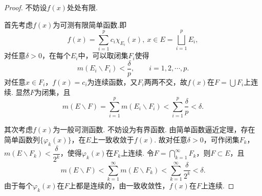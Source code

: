 \documentclass[12pt]{ctexart}
\theoremstyle{definition}
\theoremstyle{plain}
\begin{document}
	\begin{proof}
		不妨设$f(x)$处处有限.
		
		首先考虑$f(x)$为可测有限简单函数.即
		$$f(x)=\sum_{i=1}^{p}c_i\chi_{E_i}(x),\ x\in E=\bigsqcup_{i=1}^{p}E_i,$$
		对任意$\delta>0$，在每个$E_i$中，可以取闭集$F_i$使得
		$$m(E_i\backslash F_i)<\frac{\delta}{p},\qquad i=1,2,\cdots,p.$$ 
		对任意$x\in F_i$，$f(x)=c_i$为连续函数，又$F_i$两两不交，故$f(x)$在$F=\bigcup F_i$上连续. 显然$F$为闭集，且
		$$m(E\backslash F)=\sum_{i=1}^{p}m(E_i\backslash F_i)<\sum_{i=1}^{p}\frac{\delta}{p}<\delta.$$
		
		其次考虑$f(x)$为一般可测函数. 不妨设为有界函数. 由简单函数逼近定理，存在简单函数列$\{\varphi_k(x)\}$，在$E$上一致收敛于$f(x)$. 故对任意$\delta>0$，可作闭集$F_k$，$m(E\backslash F_k)<\dfrac{\delta}{2^k}$，使得$\varphi_k(x)$在$F_k$上连续. 令$F=\bigcap_{k=1}^{\infty}F_k$，则$F\subset E$，且
		$$m(E\backslash F)<\sum_{k=1}^{\infty}m\left(E\backslash F_k\right)<\sum_{k=1}^{\infty}\frac{\delta}{2^k}<\delta.$$
		由于每个$\varphi_k(x)$在$F$上都是连续的，由一致收敛性，$f(x)$在$F$上连续.
		
		
	\end{proof}
\end{document}
